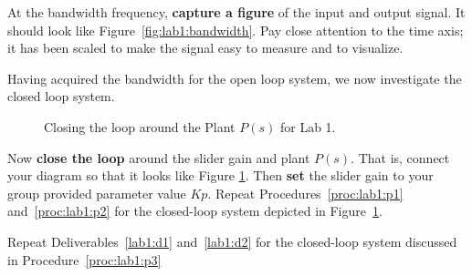 %
\begin{deliverable}[label={lab1:d2}]
  At the bandwidth frequency,
  \textbf{capture a figure} of the input and output signal. It should look
  like Figure~\ref{fig:lab1:bandwidth}. Pay close attention to the time
  axis; it has been scaled to make the signal easy to measure and to visualize.
\end{deliverable}
%
Having acquired the bandwidth for the open loop system, we now investigate
the closed loop system.
%
\begin{figure}
  \centering
  \caption{
    Closing the loop around the Plant \(P(s)\) for Lab 1.
  }
  \label{fig:lab1:closing-loop}
\end{figure}
%
\begin{procedure}[label={proc:lab1:p3}]
  Now \textbf{close the loop} around the slider gain and plant \(P(s).\) That
  is, connect your diagram so that it looks like Figure
  \ref{fig:lab1:closing-loop}. Then \textbf{set} the slider gain to
  your group provided parameter value \(Kp.\)
  Repeat Procedures~\ref{proc:lab1:p1} and~\ref{proc:lab1:p2} for the
  closed-loop system depicted in Figure~\ref{fig:lab1:closing-loop}.
\end{procedure}
%
\begin{deliverable}[label={lab1:d3}]
  Repeat Deliverables~\ref{lab1:d1} and~\ref{lab1:d2} for the closed-loop
  system discussed in Procedure~\ref{proc:lab1:p3}
\end{deliverable}

